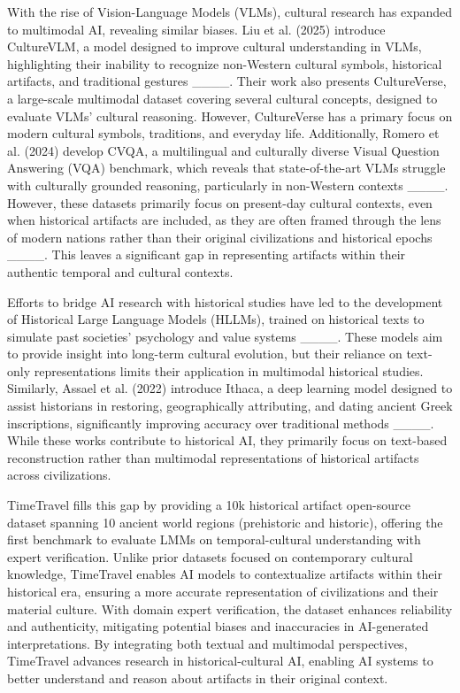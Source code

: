 With the rise of Vision-Language Models (VLMs), cultural research has expanded to multimodal AI, revealing similar biases. Liu et al. (2025) introduce CultureVLM, a model designed to improve cultural understanding in VLMs, highlighting their inability to recognize non-Western cultural symbols, historical artifacts, and traditional gestures ____. Their work also presents CultureVerse, a large-scale multimodal dataset covering several cultural concepts, designed to evaluate VLMs' cultural reasoning. However, CultureVerse has a primary focus on modern cultural symbols, traditions, and everyday life. Additionally, Romero et al. (2024) develop CVQA, a multilingual and culturally diverse Visual Question Answering (VQA) benchmark, which reveals that state-of-the-art VLMs struggle with culturally grounded reasoning, particularly in non-Western contexts ____. However, these datasets primarily focus on present-day cultural contexts, even when historical artifacts are included, as they are often framed through the lens of modern nations rather than their original civilizations and historical epochs ____. This leaves a significant gap in representing artifacts within their authentic temporal and cultural contexts.

Efforts to bridge AI research with historical studies have led to the development of Historical Large Language Models (HLLMs), trained on historical texts to simulate past societies' psychology and value systems ____. These models aim to provide insight into long-term cultural evolution, but their reliance on text-only representations limits their application in multimodal historical studies. Similarly, Assael et al. (2022) introduce Ithaca, a deep learning model designed to assist historians in restoring, geographically attributing, and dating ancient Greek inscriptions, significantly improving accuracy over traditional methods ____. While these works contribute to historical AI, they primarily focus on text-based reconstruction rather than multimodal representations of historical artifacts across civilizations.

TimeTravel fills this gap by providing a 10k historical artifact open-source dataset spanning 10 ancient world regions (prehistoric and historic), offering the first benchmark to evaluate LMMs on temporal-cultural understanding with expert verification. Unlike prior datasets focused on contemporary cultural knowledge, TimeTravel enables AI models to contextualize artifacts within their historical era, ensuring a more accurate representation of civilizations and their material culture. With domain expert verification, the dataset enhances reliability and authenticity, mitigating potential biases and inaccuracies in AI-generated interpretations. By integrating both textual and multimodal perspectives, TimeTravel advances research in historical-cultural AI, enabling AI systems to better understand and reason about artifacts in their original context.